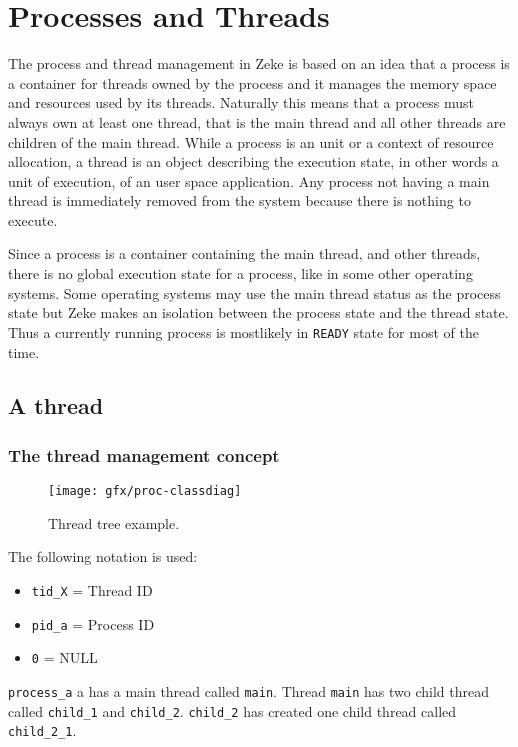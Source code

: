\chapter{Processes and Threads}

The process and thread management in Zeke is based on an idea that a
process is a container for threads owned by the process and it manages the
memory space and resources used by its threads. Naturally this means that a
process must always own at least one thread, that is the main thread and all
other threads are children of the main thread. While a process is an unit
or a context of resource allocation, a thread is an object describing the
execution state, in other words a unit of execution, of an user space
application. Any process not having a main thread is immediately removed
from the system because there is nothing to execute.

Since a process is a container containing the main thread, and other threads,
there is no global execution state for a process, like in some other operating
systems. Some operating systems may use the main thread status as the process
state but Zeke makes an isolation between the process state and the thread
state. Thus a currently running process is mostlikely in \verb+READY+ state
for most of the time.

\section{A thread}

\subsection{The thread management concept}

\begin{figure}
  \center
  \texttt{[image: gfx/proc-classdiag]}
  \caption{Thread tree example.}
  \label{figure:thtree}
\end{figure}

The following notation is used:

\begin{itemize}
  \item \verb+tid_X+ = Thread ID
  \item \verb+pid_a+ = Process ID
  \item \verb+0+ = NULL
\end{itemize}

\verb+process_a+ a has a main thread called \verb+main+. Thread
\verb+main+ has two child thread called \verb+child_1+ and \verb+child_2+.
\verb+child_2+ has created one child thread called \verb+child_2_1+.

